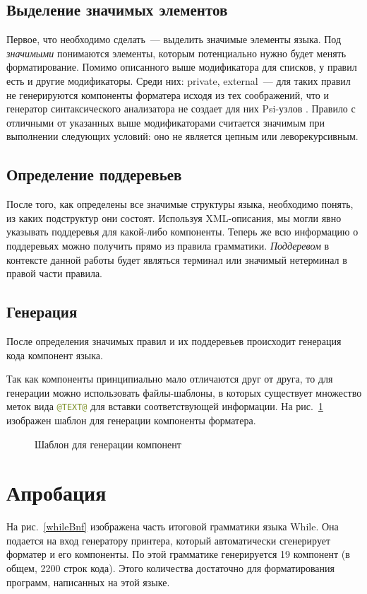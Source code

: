 \documentclass[conference]{IEEEtran}
\begin{document}
\subsection{Выделение значимых элементов}
Первое, что необходимо сделать~--- выделить значимые элементы языка. 
Под \emph{значимыми} понимаются элементы, которым потенциально нужно будет менять форматирование.
Помимо описанного выше модификатора для списков, у правил есть и другие модификаторы.
Среди них: private, external~--- для таких правил не генерируются компоненты форматера исходя из тех соображений, что и генератор синтаксического анализатора не создает для них Psi-узлов .
Правило с отличными от указанных выше модификаторами считается значимым при выполнении следующих условий: оно не является цепным или леворекурсивным.

\subsection{Определение поддеревьев}
После того, как определены все значимые структуры языка, необходимо понять, из каких подструктур они состоят.
Используя XML-описания, мы могли явно указывать поддеревья для какой-либо компоненты.
Теперь же всю информацию о поддеревьях можно получить прямо из правила грамматики.
\emph{Поддеревом} в контексте данной работы будет являться терминал или значимый нетерминал в правой части правила.

\subsection{Генерация}
После определения значимых правил и их поддеревьев происходит генерация кода компонент языка.

Так как компоненты принципиально мало отличаются друг от друга, то для генерации можно использовать файлы-шаблоны, в которых существует множество меток вида \lstinline[language=java]{@TEXT@} для вставки соответствующей информации.
На рис.~\ref{component} изображен шаблон для генерации компоненты форматера.
\begin{figure}[h]
	\centering
	
	\caption{Шаблон для генерации компонент}
	\label{component}
\end{figure}

\section{Апробация}
На рис.~\ref{whileBnf} изображена часть итоговой грамматики языка While.
Она подается на вход генератору принтера, который автоматически сгенерирует форматер и его компоненты.
По этой грамматике генерируется 19 компонент (в общем, 2200 строк кода).
Этого количества достаточно для форматирования программ, написанных на этой языке.
\end{document}
